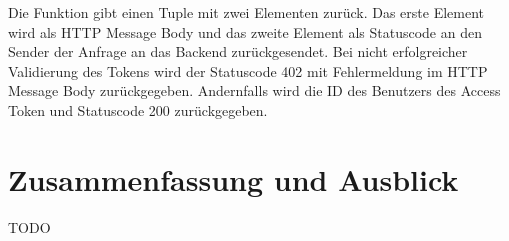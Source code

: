 Die Funktion gibt einen Tuple mit zwei Elementen zurück. Das erste Element wird als HTTP Message Body und das zweite Element als Statuscode an den Sender der Anfrage an das Backend zurückgesendet. Bei nicht erfolgreicher Validierung des Tokens wird der Statuscode 402 mit Fehlermeldung im HTTP Message Body zurückgegeben. Andernfalls wird die ID des Benutzers des Access Token und Statuscode 200 zurückgegeben.


\section{Zusammenfassung und Ausblick}

TODO






